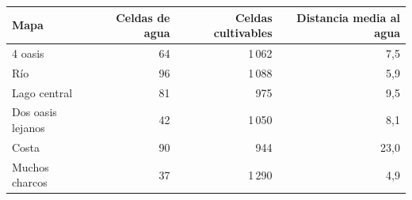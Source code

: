 \begin{tabular}{lrrr}
\toprule
Mapa & Celdas de agua & Celdas cultivables & Distancia media al agua \\
\midrule
4 oasis & 64 & 1\,062 & 7,5 \\
Río & 96 & 1\,088 & 5,9 \\
Lago central & 81 & 975 & 9,5 \\
Dos oasis lejanos & 42 & 1\,050 & 8,1 \\
Costa & 90 & 944 & 23,0 \\
Muchos charcos & 37 & 1\,290 & 4,9 \\
\bottomrule
\end{tabular}
